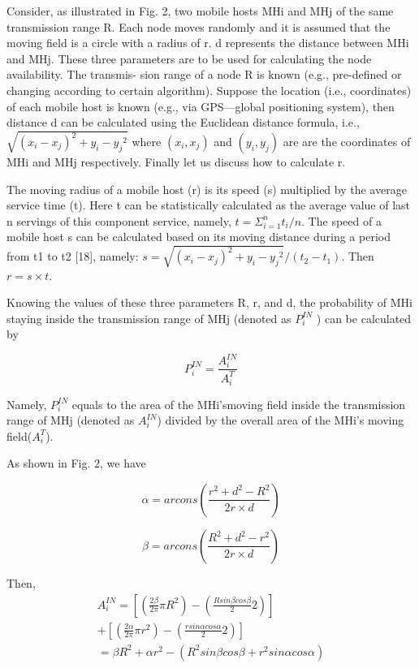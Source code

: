 \documentclass[10pt,journal,compsoc]{IEEEtran}
\begin{document}
Consider, as illustrated in Fig. 2, two mobile hosts MHi
and MHj of the same transmission range R. Each node moves randomly and it is assumed that the moving field is a circle with a radius of r. d represents the distance between MHi and MHj. These three parameters are to be used for calculating the node availability. The transmis- sion range of a node R is known (e.g., pre-defined or changing according to certain algorithm). Suppose the location (i.e., coordinates) of each mobile host is known (e.g., via GPS—global positioning system), then distance d can be calculated using the Euclidean distance formula, i.e.,$\sqrt{{(x_i-x_j)^2}+{y_i-y_j}^2}$ where $(x_i, x_j)$ and $(y_i, y_j)$ are are the coordinates of MHi and MHj respectively. Finally let us discuss how to calculate r.

The moving radius of a mobile host (r) is its speed (s) multiplied by the average service time (t). Here t can be statistically calculated as the average value of last n servings of this component service, namely, $t = \Sigma_{i=1}^{n}t_i/n$. The speed of a mobile host s can be calculated based on its moving distance during a period from t1 to t2 [18], namely: $s = \sqrt{{(x_i-x_j)^2}+{y_i-y_j}^2}/(t_2-t_1)$. Then $r = s \times t$.

Knowing the values of these three parameters R, r,
and d, the probability of MHi staying inside the transmission range of MHj (denoted as $P_i^{IN}$ ) can be calculated by

\begin{equation}
P_i^{IN} = \frac{A_i^{IN}}{A_i^T}
\end{equation}

Namely, $P^{IN}_i$ equals to the area of the MHi’smoving field inside the transmission range of MHj (denoted as $A^{IN}_i$) divided by the overall area of the MHi’s moving field($A^T_i$).

As shown in Fig. 2, we have

\begin{equation}
\alpha = arcons(\frac{r^2+d^2-R^2}{2r\times d})
\end{equation}

\begin{equation}
\beta = arcons(\frac{R^2+d^2-r^2}{2r\times d})
\end{equation}

Then, 
\begin{eqnarray}
A^{IN}_i = [(\frac{2\beta}{2\pi}\pi R^2)-(\frac{R sin\beta cos\beta}{2}2)]\\\nonumber
+ [(\frac{2\alpha}{2\pi}\pi r^2)-(\frac{r sin\alpha cos\alpha}{2}2)]\\\nonumber
= \beta R^2 + \alpha r^2 - (R^2 sin\beta cos\beta + r^2 sin\alpha cos\alpha)
\end{eqnarray}
\end{document}
